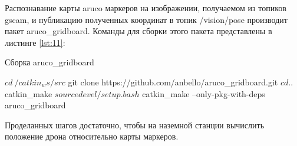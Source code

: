 Распознавание карты aruco маркеров на изображении, получаемом из топиков gscam, и публикацию полученных координат в топик /vision/pose производит пакет aruco\_gridboard. Команды для сборки этого пакета представлены в листинге \ref{lst:11}:
\begin{Program}[H]
	\caption{Сборка aruco\_gridboard} \label{lst:11}
\begin{MyCode}	
$ cd ~/catkin_ws/src
$ git clone https://github.com/anbello/aruco_gridboard.git
$ cd ..
$ catkin_make
$ source devel/setup.bash
$ catkin_make --only-pkg-with-deps aruco_gridboard
\end{MyCode}
\end{Program}

Проделанных шагов достаточно, чтобы на наземной станции вычислить положение дрона относительно карты маркеров.
